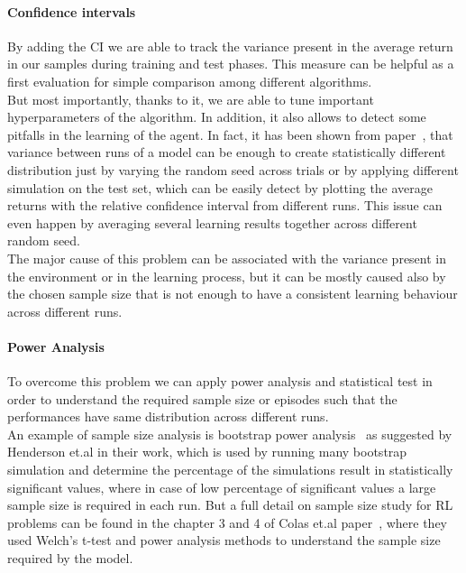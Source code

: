 \documentclass{article}
\begin{document}
\paragraph{Confidence intervals}
By adding the CI we are able to track the variance present in the average return in our samples during training and test phases. This measure can be helpful as a first evaluation for simple comparison among different algorithms.\\ But most importantly, thanks to it, we are able to tune important hyperparameters of the algorithm. In addition, it also allows to detect some pitfalls in the learning of the agent. In fact, it has been shown from paper~\cite{DRL01}, that variance between runs of a model can be enough to create statistically different distribution just by varying the random seed across trials or by applying different simulation on the test set, which can be easily detect by plotting the average returns with the relative confidence interval from different runs.
This issue can even happen by averaging several learning results together across different random seed.\\
The major cause of this problem can be associated with the variance present in the environment or in the learning process, but it can be mostly caused also by the chosen sample size that is not enough to have a consistent learning behaviour across different runs.
\paragraph{Power Analysis}
To overcome this problem we can apply power analysis and statistical test in order to understand the required sample size or episodes such that the performances have same distribution across different runs.\\
An example of sample size analysis is bootstrap power analysis~\cite{pwranaly2} as suggested by Henderson et.al \cite{DRL01} in their work, which is used by running many bootstrap simulation and determine the percentage of the simulations result in statistically significant values, where in case of low percentage of significant values a large sample size is required in each run. But a full detail on sample size study for RL problems can be found in the chapter 3 and 4 of Colas et.al paper~\cite{PowerAnalysis}, where they used Welch's t-test and power analysis methods to understand the sample size required by the model.
\end{document}

